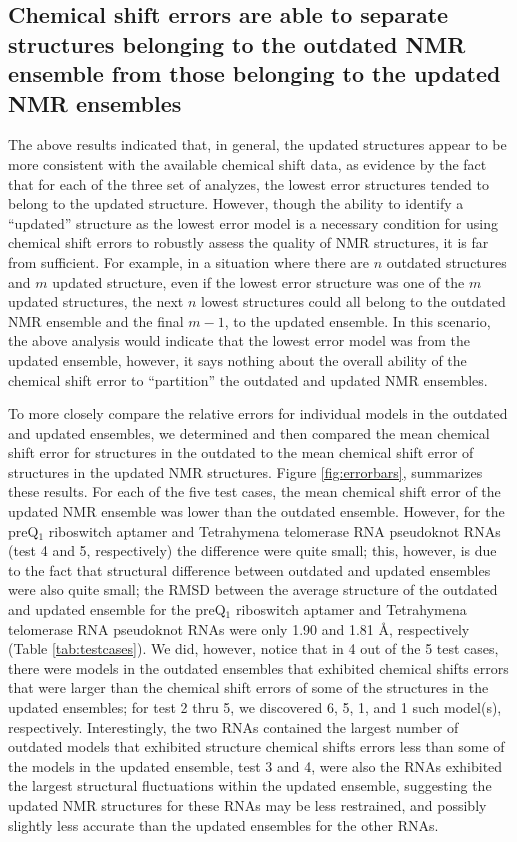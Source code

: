 \documentclass[fleqn,10pt]{wlscirep}
\begin{document}
\subsection*{Chemical shift errors are able to separate structures belonging to the outdated NMR ensemble from those belonging to the updated NMR ensembles} The above results indicated that, in general, the updated structures appear to be more consistent with the available chemical shift data, as evidence by the fact that for each of the three set of analyzes, the lowest error structures tended to belong to the updated structure. However, though the ability to identify a ``updated'' structure as the lowest error model is a necessary condition for using chemical shift errors to robustly assess the quality of NMR structures, it is far from sufficient. For example, in a situation where there are $n$ outdated  structures and $m$ updated structure, even if the lowest error structure was one of the $m$ updated structures, the next $n$ lowest structures could all belong to the outdated NMR ensemble and the final $m-1$, to the updated ensemble. In this scenario, the above analysis would indicate that the lowest error model was from the updated ensemble, however, it says nothing about the overall ability of the chemical shift error to ``partition'' the outdated  and updated NMR ensembles.

To more closely compare the relative errors for individual models in the outdated and updated ensembles, we determined and then compared the mean chemical shift error for structures in the outdated to the mean chemical shift error of structures in the updated NMR structures. Figure \ref{fig:errorbars}, summarizes these results. For each of the five test cases, the mean chemical shift error of the updated NMR ensemble was lower than the outdated ensemble. However, for the preQ$_{1}$ riboswitch aptamer and Tetrahymena telomerase RNA pseudoknot RNAs (test 4 and 5, respectively) the difference were quite small; this, however, is due to the fact that structural difference between outdated and updated ensembles were also quite small; the RMSD between the average structure of the outdated and updated ensemble for the preQ$_{1}$ riboswitch aptamer and Tetrahymena telomerase RNA pseudoknot  RNAs were only 1.90 and 1.81 \AA, respectively (Table \ref{tab:testcases}). We did, however, notice that in 4 out of the 5 test cases, there were models in the outdated ensembles that exhibited chemical shifts errors that were larger than the chemical shift errors of some of the structures in the updated ensembles; for test 2 thru 5, we discovered 6, 5, 1, and 1 such model(s), respectively. Interestingly, the two RNAs contained the largest number of outdated models that exhibited structure chemical shifts errors less than some of the models in the updated ensemble, test 3 and 4, were also the RNAs exhibited the largest structural fluctuations within the updated ensemble, suggesting the updated NMR structures for these RNAs may be less restrained, and possibly slightly less accurate than the updated ensembles for the other RNAs. 
\end{document}
